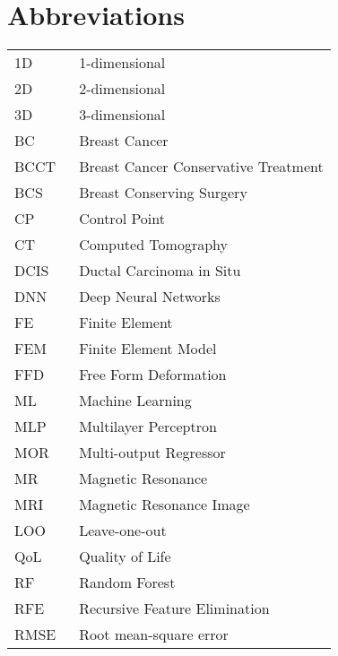 \chapter*{Abbreviations}

\begin{flushleft}
\begin{tabular}{l p{0.8\linewidth}}
1D		 & 1-dimensional\\
2D  	 & 2-dimensional\\
3D  	 & 3-dimensional\\
BC		 & Breast Cancer\\
BCCT 	 & Breast Cancer Conservative Treatment\\
BCS		 & Breast Conserving Surgery\\
CP		 & Control Point\\
CT		 & Computed Tomography\\
DCIS	 & Ductal Carcinoma in Situ\\
DNN		 & Deep Neural Networks\\
FE		 & Finite Element\\
FEM		 & Finite Element Model\\
FFD		 & Free Form Deformation\\
ML		 & Machine Learning\\
MLP		 & Multilayer Perceptron\\
MOR		 & Multi-output Regressor\\
MR		 & Magnetic Resonance\\
MRI		 & Magnetic Resonance Image\\
LOO		 & Leave-one-out\\
QoL		 & Quality of Life\\
RF		 & Random Forest\\
RFE		 & Recursive Feature Elimination\\
RMSE	 & Root mean-square error
\end{tabular}
\end{flushleft}

